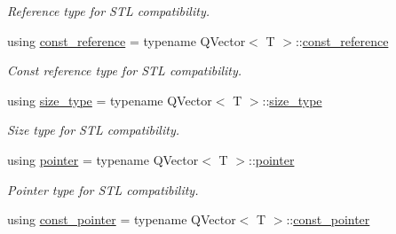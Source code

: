 \begin{DoxyCompactItemize}
\begin{DoxyCompactList}\small\item\em Reference type for S\+TL compatibility. \end{DoxyCompactList}\item 
using \hyperlink{class_mdt_1_1_plain_text_1_1_record_template_a0ffd0ced9230d5bf9ee0667187afe4d1}{const\+\_\+reference} = typename Q\+Vector$<$ T $>$\+::\hyperlink{class_mdt_1_1_plain_text_1_1_record_template_a0ffd0ced9230d5bf9ee0667187afe4d1}{const\+\_\+reference}\hypertarget{class_mdt_1_1_plain_text_1_1_record_template_a0ffd0ced9230d5bf9ee0667187afe4d1}{}\label{class_mdt_1_1_plain_text_1_1_record_template_a0ffd0ced9230d5bf9ee0667187afe4d1}

\begin{DoxyCompactList}\small\item\em Const reference type for S\+TL compatibility. \end{DoxyCompactList}\item 
using \hyperlink{class_mdt_1_1_plain_text_1_1_record_template_ad2fed94c3d0dc5b0c3e28db212441a27}{size\+\_\+type} = typename Q\+Vector$<$ T $>$\+::\hyperlink{class_mdt_1_1_plain_text_1_1_record_template_ad2fed94c3d0dc5b0c3e28db212441a27}{size\+\_\+type}\hypertarget{class_mdt_1_1_plain_text_1_1_record_template_ad2fed94c3d0dc5b0c3e28db212441a27}{}\label{class_mdt_1_1_plain_text_1_1_record_template_ad2fed94c3d0dc5b0c3e28db212441a27}

\begin{DoxyCompactList}\small\item\em Size type for S\+TL compatibility. \end{DoxyCompactList}\item 
using \hyperlink{class_mdt_1_1_plain_text_1_1_record_template_ab1e3e7564bfe55912676507a2d09bad4}{pointer} = typename Q\+Vector$<$ T $>$\+::\hyperlink{class_mdt_1_1_plain_text_1_1_record_template_ab1e3e7564bfe55912676507a2d09bad4}{pointer}\hypertarget{class_mdt_1_1_plain_text_1_1_record_template_ab1e3e7564bfe55912676507a2d09bad4}{}\label{class_mdt_1_1_plain_text_1_1_record_template_ab1e3e7564bfe55912676507a2d09bad4}

\begin{DoxyCompactList}\small\item\em Pointer type for S\+TL compatibility. \end{DoxyCompactList}\item 
using \hyperlink{class_mdt_1_1_plain_text_1_1_record_template_a73aada75aed958eafa509e4e7161864c}{const\+\_\+pointer} = typename Q\+Vector$<$ T $>$\+::\hyperlink{class_mdt_1_1_plain_text_1_1_record_template_a73aada75aed958eafa509e4e7161864c}{const\+\_\+pointer}\hypertarget{class_mdt_1_1_plain_text_1_1_record_template_a73aada75aed958eafa509e4e7161864c}{}\label{class_mdt_1_1_plain_text_1_1_record_template_a73aada75aed958eafa509e4e7161864c}


\end{DoxyCompactItemize}
